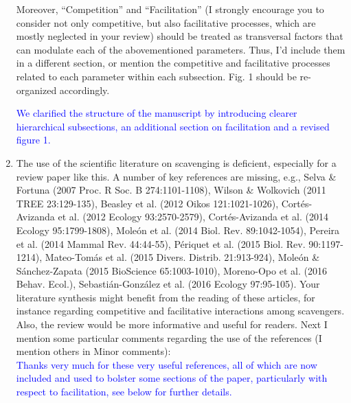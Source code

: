 \documentclass[12pt,letterpaper]{article}
\begin{document}
\begin{enumerate}
{Moreover, ``Competition'' and ``Facilitation'' (I strongly encourage you to consider not only competitive, but also facilitative processes, which are mostly neglected in your review) should be treated as transversal factors that can modulate each of the abovementioned parameters. Thus, I'd include them in a different section, or mention the competitive and facilitative processes related to each parameter within each subsection. Fig. 1 should be re-organized accordingly.}

\textcolor{blue}{We clarified the structure of the manuscript by introducing clearer hierarchical subsections, an additional section on facilitation and a revised figure 1.}


\item{The use of the scientific literature on scavenging is deficient, especially for a review paper like this. A number of key references are missing, e.g., Selva \& Fortuna (2007 Proc. R Soc. B 274:1101-1108), Wilson \& Wolkovich (2011 TREE 23:129-135), Beasley et al. (2012 Oikos 121:1021-1026), Cort\'{e}s-Avizanda et al. (2012 Ecology 93:2570-2579), Cort\'{e}s-Avizanda et al. (2014 Ecology 95:1799-1808), Mole\'{o}n et al. (2014 Biol. Rev. 89:1042-1054), Pereira et al. (2014 Mammal Rev. 44:44-55), P\'{e}riquet et al. (2015 Biol. Rev. 90:1197-1214), Mateo-Tom\'{a}s et al. (2015 Divers. Distrib. 21:913-924), Mole\'{o}n \& S\'{a}nchez-Zapata (2015 BioScience 65:1003-1010), Moreno-Opo et al. (2016 Behav. Ecol.), Sebasti\'{a}n-Gonz\'{a}lez et al. (2016 Ecology 97:95-105). Your literature synthesis might benefit from the reading of these articles, for instance regarding competitive and facilitative interactions among scavengers. Also, the review would be more informative and useful for readers. Next I mention some particular comments regarding the use of the references (I mention others in Minor comments):}\\

\textcolor{blue}{Thanks very much for these very useful references, all of which are now included and used to bolster some sections of the paper, particularly with respect to facilitation, see below for further details.}


\end{enumerate}
\end{document}
